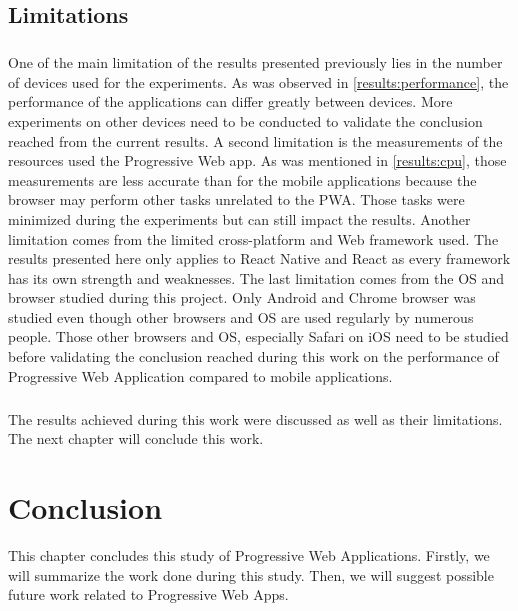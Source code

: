 \documentclass{kththesis}
\begin{document}
\section{Limitations}

\paragraph{}
One of the main limitation of the results presented previously lies in the number of devices used for the experiments. As was observed in \autoref{results:performance}, the performance of the applications can differ greatly between devices. More experiments on other devices need to be conducted to validate the conclusion reached from the current results. \newline
A second limitation is the measurements of the resources used the Progressive Web app. As was mentioned in \autoref{results:cpu}, those measurements are less accurate than for the mobile applications because the browser may perform other tasks unrelated to the PWA. Those tasks were minimized during the experiments but can still impact the results. \newline
Another limitation comes from the limited cross-platform and Web framework used. The results presented here only applies to React Native and React as every framework has its own strength and weaknesses. 
The last limitation comes from the OS and browser studied during this project. Only Android and Chrome browser was studied even though other browsers and OS are used regularly by numerous people. Those other browsers and OS, especially Safari on iOS need to be studied before validating the conclusion reached during this work on the performance of Progressive Web Application compared to mobile applications.

\paragraph{}
The results achieved during this work were discussed as well as their limitations. The next chapter will conclude this work. 


\chapter{Conclusion}
\label{ch:conclusion}

This chapter concludes this study of Progressive Web Applications. Firstly, we will summarize the work done during this study. Then, we will suggest possible future work related to Progressive Web Apps.
\end{document}
